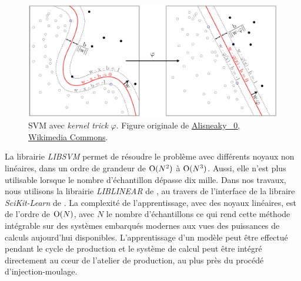 \begin{figure}[hbtp]
    \centering
    \includegraphics[width=\textwidth,height=\textheight,keepaspectratio]{../Chap4/Figures/Kernel_Machine_Pierre.pdf}
    \caption{SVM avec \emph{kernel trick} $\varphi$. Figure originale de \href{https://commons.wikimedia.org/wiki/File:Kernel_Machine.png}{Alisneaky \ccLogo \ \textnormal{0}, Wikimedia Commons}.}
    \label{fig:svm}
\end{figure}

La librairie \textit{LIBSVM} \cite{chang_libsvm_2011} permet de résoudre le problème avec différents noyaux non linéaires, dans un ordre de grandeur de $\operatorname{O}(N^2)$ à $\operatorname{O}(N^3)$.
Aussi, elle n'est plus utilisable lorsque le nombre d'échantillon dépasse dix mille.
Dans nos travaux, nous utilisons la librairie \textit{LIBLINEAR} de \citeauthor{fan_liblinear_2008} \cite{fan_liblinear_2008}, au travers de l'interface de la libraire \textit{SciKit-Learn} de \citeauthor{pedregosa_scikit-learn_2011} \cite{pedregosa_scikit-learn_2011}.
La complexité de l'apprentissage, avec des noyaux linéaires, est de l'ordre de $\operatorname{O}(N)$, avec $N$ le nombre d'échantillons ce qui rend cette méthode intégrable sur des systèmes embarqués modernes aux vues des puissances de calculs aujourd'hui disponibles.
L'apprentissage d'un modèle peut être effectué pendant le cycle de production et le système de calcul peut être intégré directement au cœur de l'atelier de production, au plus près du procédé d'injection-moulage.

